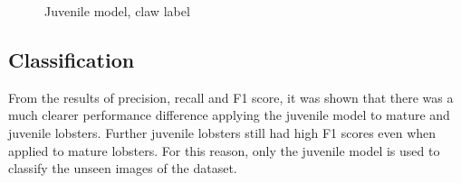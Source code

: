 \begin{figure}[H]
\caption{Juvenile model, claw label}
\end{figure}

\subsection{Classification}
From the results of precision, recall and F1 score, it was shown that there was a much clearer performance difference applying the juvenile model to mature and juvenile lobsters. Further juvenile lobsters still had high F1 scores even when applied to mature lobsters. For this reason, only the juvenile model is used to classify the unseen images of the dataset. 
